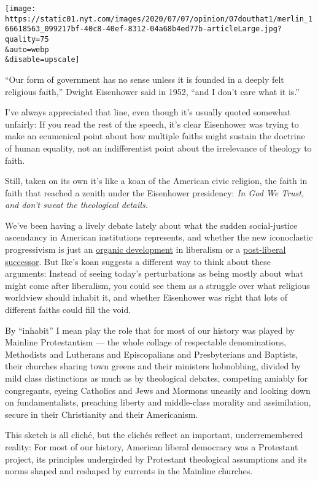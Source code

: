 \texttt{[image: https://static01.nyt.com/images/2020/07/07/opinion/07douthat1/merlin\_166618563\_099217bf-40c8-40ef-8312-04a68b4ed77b-articleLarge.jpg?quality=75\\\&auto=webp\\\&disable=upscale]}

``Our form of government has no sense unless it is founded in a deeply
felt religious faith,'' Dwight Eisenhower said in 1952, ``and I don't
care what it is.''

I've always appreciated that line, even though it's usually quoted
somewhat unfairly: If you read the rest of the speech, it's clear
Eisenhower was trying to make an ecumenical point about how multiple
faiths might sustain the doctrine of human equality, not an
indifferentist point about the irrelevance of theology to faith.

Still, taken on its own it's like a koan of the American civic religion,
the faith in faith that reached a zenith under the Eisenhower
presidency: \emph{In God We Trust, and don't sweat the theological
details.}

We've been having a lively debate lately about what the sudden
social-justice ascendancy in American institutions represents, and
whether the new iconoclastic progressivism is just an
\href{https://newrepublic.com/article/158346/willful-blindness-reactionary-liberalism}{organic
development} in liberalism or a
\href{https://www.nytimes.com/2020/06/12/opinion/nyt-tom-cotton-oped-liberalism.html}{post-liberal
successor}. But Ike's koan suggests a different way to think about these
arguments: Instead of seeing today's perturbations as being mostly about
what might come after liberalism, you could see them as a struggle over
what religious worldview should inhabit it, and whether Eisenhower was
right that lots of different faiths could fill the void.

By ``inhabit'' I mean play the role that for most of our history was
played by Mainline Protestantism --- the whole collage of respectable
denominations, Methodists and Lutherans and Episcopalians and
Presbyterians and Baptists, their churches sharing town greens and their
ministers hobnobbing, divided by mild class distinctions as much as by
theological debates, competing amiably for congregants, eyeing Catholics
and Jews and Mormons uneasily and looking down on fundamentalists,
preaching liberty and middle-class morality and assimilation, secure in
their Christianity and their Americanism.

This sketch is all cliché, but the clichés reflect an important,
underremembered reality: For most of our history, American liberal
democracy was a Protestant project, its principles undergirded by
Protestant theological assumptions and its norms shaped and reshaped by
currents in the Mainline churches.

